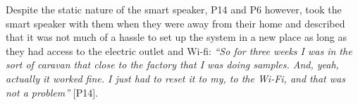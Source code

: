 
        Despite the static nature of the smart speaker, P14 and P6 however, took the smart speaker with them when they were away from their home and described that it was not much of a hassle to set up the system in a new place as long as they had access to the electric outlet and Wi-fi:
            \textit{``So for three weeks I was in the sort of caravan that close to the factory that I was doing samples. And, yeah, actually it worked fine. I just had to reset it to my, to the Wi-Fi, and that was not a problem''}
            [P14].
        
